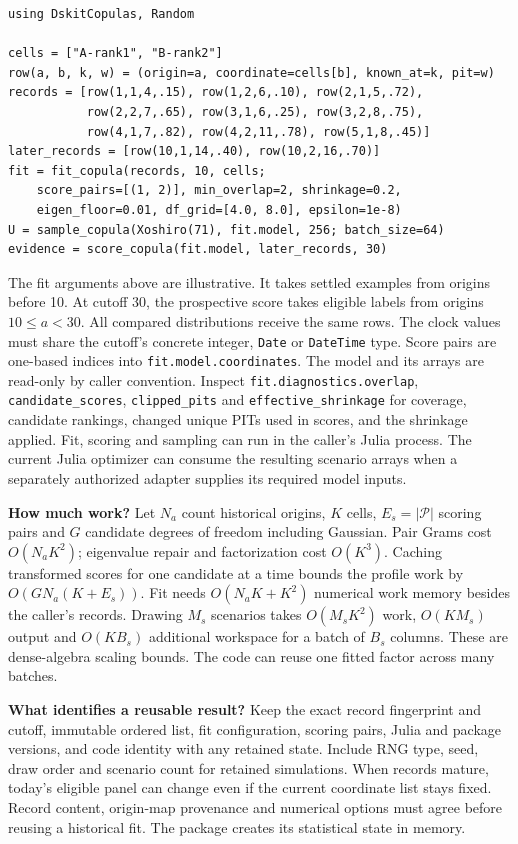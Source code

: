 \documentclass[11pt,letterpaper]{article}
\newcommand{\lead}[1]{\textbf{\textcolor{accent}{#1}}}
\newcommand{\edge}{\mathcal P}
\begin{document}
\begin{small}
\begin{verbatim}
using DskitCopulas, Random

cells = ["A-rank1", "B-rank2"]
row(a, b, k, w) = (origin=a, coordinate=cells[b], known_at=k, pit=w)
records = [row(1,1,4,.15), row(1,2,6,.10), row(2,1,5,.72),
           row(2,2,7,.65), row(3,1,6,.25), row(3,2,8,.75),
           row(4,1,7,.82), row(4,2,11,.78), row(5,1,8,.45)]
later_records = [row(10,1,14,.40), row(10,2,16,.70)]
fit = fit_copula(records, 10, cells;
    score_pairs=[(1, 2)], min_overlap=2, shrinkage=0.2,
    eigen_floor=0.01, df_grid=[4.0, 8.0], epsilon=1e-8)
U = sample_copula(Xoshiro(71), fit.model, 256; batch_size=64)
evidence = score_copula(fit.model, later_records, 30)
\end{verbatim}
\end{small}
The fit arguments above are illustrative. It takes settled examples from origins before 10. At cutoff 30, the prospective score takes eligible labels from origins \(10\le a<30\). All compared distributions receive the same rows. The clock values must share the cutoff's concrete integer, \texttt{Date} or \texttt{DateTime} type. Score pairs are one-based indices into \texttt{fit.model.coordinates}. The model and its arrays are read-only by caller convention. Inspect \texttt{fit.diagnostics.overlap}, \texttt{candidate\_scores}, \texttt{clipped\_pits} and \texttt{effective\_shrinkage} for coverage, candidate rankings, changed unique PITs used in scores, and the shrinkage applied. Fit, scoring and sampling can run in the caller's Julia process. The current Julia optimizer can consume the resulting scenario arrays when a separately authorized adapter supplies its required model inputs.

\lead{How much work?} Let \(N_a\) count historical origins, \(K\) cells, \(E_s=|\edge|\) scoring pairs and \(G\) candidate degrees of freedom including Gaussian. Pair Grams cost \(O(N_aK^2)\); eigenvalue repair and factorization cost \(O(K^3)\). Caching transformed scores for one candidate at a time bounds the profile work by \(O(GN_a(K+E_s))\). Fit needs \(O(N_aK+K^2)\) numerical work memory besides the caller's records. Drawing \(M_s\) scenarios takes \(O(M_sK^2)\) work, \(O(KM_s)\) output and \(O(KB_s)\) additional workspace for a batch of \(B_s\) columns. These are dense-algebra scaling bounds. The code can reuse one fitted factor across many batches.

\lead{What identifies a reusable result?} Keep the exact record fingerprint and cutoff, immutable ordered list, fit configuration, scoring pairs, Julia and package versions, and code identity with any retained state. Include RNG type, seed, draw order and scenario count for retained simulations. When records mature, today's eligible panel can change even if the current coordinate list stays fixed. Record content, origin-map provenance and numerical options must agree before reusing a historical fit. The package creates its statistical state in memory.
\end{document}
